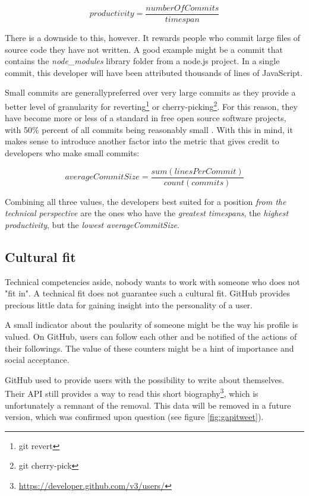 \begin{equation}
productivity = \frac{numberOfCommits}{timespan}
\label{eq:productivity}
\end{equation}

There is a downside to this, however. It rewards people who commit
large files of source code they have not written. A good example might be
a commit that contains the \textit{node\_modules} library folder from a
node.js project. In a single commit, this developer will have been
attributed thousands of lines of JavaScript.

Small commits are generallypreferred \cite{so:commitsize}
over very large commits as they provide a better level of granularity for
reverting\footnote{git revert} or cherry-picking\footnote{git cherry-pick}.
For this reason, they have become more or less of a standard in
free open source software projects, with 50\% percent of all commits
being reasonably small \cite{rsk:2014}.
With this in mind, it makes sense to introduce another factor into
the metric that gives credit to developers who make small commits:

\begin{equation}
averageCommitSize = \frac{sum(linesPerCommit)}{count(commits)}
\label {eq:avgcommitsize}
\end{equation}

Combining all three values, the developers best suited for a position
\textit{from the technical perspective} are the ones who
have the \textit{greatest timespans}, the \textit{highest productivity},
but the \textit{lowest averageCommitSize}.

\subsection{Cultural fit}
Technical competencies aside, nobody wants to work with someone who does
not "fit in". A technical fit does not guarantee such a cultural fit.
GitHub provides precious little data for gaining insight into the
personality of a user.
\newline

A small indicator about the poularity of someone might be the way
his profile is valued. On GitHub, users can follow each other and be
notified of the actions of their followings. The value of these counters
might be a hint of importance and social acceptance.
\newline

GitHub used to provide users with the possibility to write about themselves.
Their API still provides a way to read this short biography\footnote{\url{https://developer.github.com/v3/users/}}, which is unfortunately a
remnant of the removal. This data will be removed in a future version,
which was confirmed upon question (see figure \ref{fig:gapitweet}).

